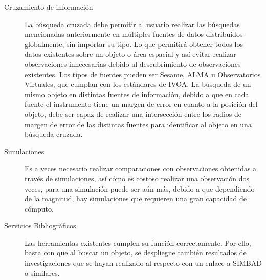 \begin{description}
	\item[Cruzamiento de información] La búsqueda cruzada debe permitir al usuario realizar las búsquedas mencionadas anteriormente	en múltiples fuentes de datos distribuidos globalmente, sin importar su tipo. Lo que permitirá obtener todos los datos existentes sobre un objeto o área espacial y así evitar realizar observaciones innecesarias debido al descubrimiento de observaciones existentes. Los tipos de fuentes pueden ser Sesame, ALMA u Observatorios Virtuales, que cumplan con los estándares de IVOA. La búsqueda de un mismo objeto en distintas fuentes de información, debido a que en cada fuente el instrumento tiene un margen de error en cuanto a la posición del objeto, debe ser capaz de realizar	una intersección entre los radios de margen de error de las distintas fuentes para identificar al objeto en una búsqueda cruzada.
	\item[Simulaciones] Es a veces necesario realizar comparaciones con observaciones obtenidas a trav\'es de simulaciones,	así cómo es costoso realizar una observación dos veces, para una simulación puede ser aún más, debido a que dependiendo de la magnitud, hay simulaciones que requieren una gran capacidad de cómputo.
	\item[Servicios Bibliográficos] Las herramientas existentes cumplen su función correctamente. Por ello, basta con que al buscar un objeto, se despliegue tambi\'en resultados de investigaciones que se hayan realizado al respecto con	un enlace a SIMBAD o similares.
\end{description}

